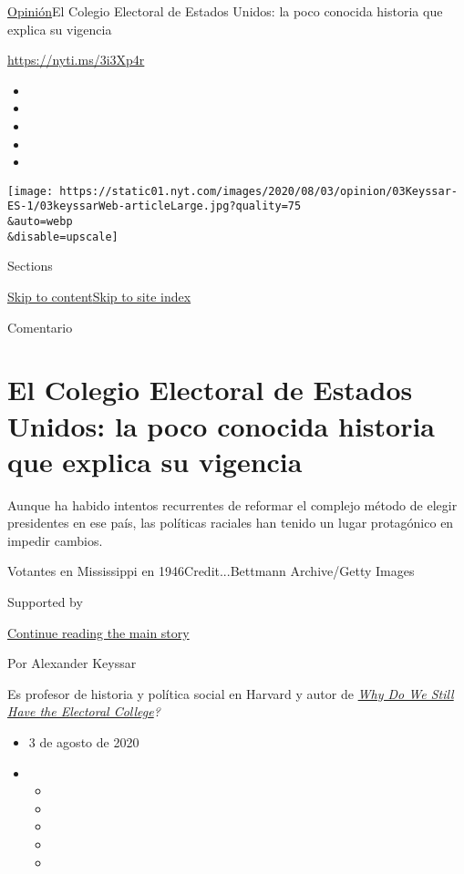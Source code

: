 \href{/es/section/opinion}{Opinión}\textbar{}El Colegio Electoral de
Estados Unidos: la poco conocida historia que explica su vigencia

\url{https://nyti.ms/3i3Xp4r}

\begin{itemize}
\item
\item
\item
\item
\item
\end{itemize}

\texttt{[image: https://static01.nyt.com/images/2020/08/03/opinion/03Keyssar-ES-1/03keyssarWeb-articleLarge.jpg?quality=75\\\&auto=webp\\\&disable=upscale]}

Sections

\protect\hyperlink{site-content}{Skip to
content}\protect\hyperlink{site-index}{Skip to site index}

Comentario

\hypertarget{el-colegio-electoral-de-estados-unidos-la-poco-conocida-historia-que-explica-su-vigencia}{%
\section{El Colegio Electoral de Estados Unidos: la poco conocida
historia que explica su
vigencia}\label{el-colegio-electoral-de-estados-unidos-la-poco-conocida-historia-que-explica-su-vigencia}}

Aunque ha habido intentos recurrentes de reformar el complejo método de
elegir presidentes en ese país, las políticas raciales han tenido un
lugar protagónico en impedir cambios.

Votantes en Mississippi en 1946Credit...Bettmann Archive/Getty Images

Supported by

\protect\hyperlink{after-sponsor}{Continue reading the main story}

Por Alexander Keyssar

Es profesor de historia y política social en Harvard y autor de
\href{https://www.hup.harvard.edu/catalog.php?isbn=9780674660151\#:~:text=After\%20tracing\%20the\%20Electoral\%20College's,showing\%20why\%20each\%20has\%20failed.}{\emph{Why
Do We Still Have the Electoral College}}\emph{?}

\begin{itemize}
\item
  3 de agosto de 2020
\item
  \begin{itemize}
  \item
  \item
  \item
  \item
  \item
  \end{itemize}
\end{itemize}

